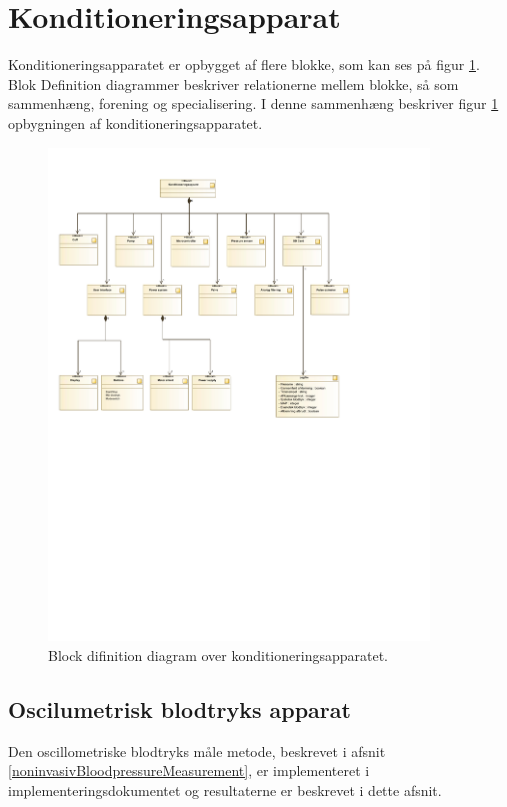 \section{Konditioneringsapparat}
Konditioneringsapparatet er opbygget af flere blokke, som kan ses på figur \ref{fig:BDD(SystemOverview)}. Blok Definition diagrammer beskriver relationerne mellem blokke, så som sammenhæng, forening og specialisering. I denne sammenhæng beskriver figur \ref{fig:BDD(SystemOverview)} opbygningen af konditioneringsapparatet. 
\begin{figure}[H]
	\centering
	\includegraphics[width=0.9\textwidth]{billeder/BDD(SystemOverview).pdf}
	\caption{Block difinition diagram over konditioneringsapparatet.}\label{fig:BDD(SystemOverview)}
\end{figure}

\subsection{Oscilumetrisk blodtryks apparat}
Den oscillometriske blodtryks måle metode, beskrevet i afsnit \ref{noninvasivBloodpressureMeasurement}, er implementeret i implementeringsdokumentet og resultaterne er beskrevet i dette afsnit.

